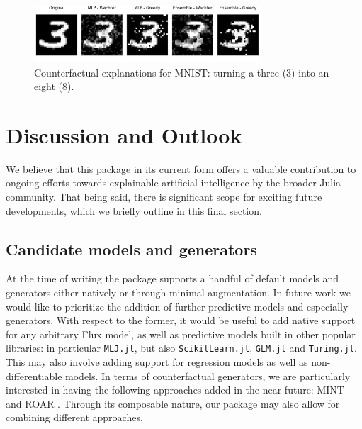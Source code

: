 \documentclass{juliacon}
\begin{document}
\begin{figure}

{\centering \includegraphics[width=3.33333in,height=0.83333in]{www/mnist_3_to_8.png}

}

\caption{\label{fig-mnist-3to8}Counterfactual explanations for MNIST:
turning a three (3) into an eight (8).}

\end{figure}

\hypertarget{sec-outlook}{%
\section{Discussion and Outlook}\label{sec-outlook}}

We believe that this package in its current form offers a valuable
contribution to ongoing efforts towards explainable artificial
intelligence by the broader Julia community. That being said, there is
significant scope for exciting future developments, which we briefly
outline in this final section.

\hypertarget{candidate-models-and-generators}{%
\subsection{Candidate models and
generators}\label{candidate-models-and-generators}}

At the time of writing the package supports a handful of default models
and generators either natively or through minimal augmentation. In
future work we would like to prioritize the addition of further
predictive models and especially generators. With respect to the former,
it would be useful to add native support for any arbitrary Flux model,
as well as predictive models built in other popular libraries: in
particular \texttt{MLJ.jl}, but also \texttt{ScikitLearn.jl},
\texttt{GLM.jl} and \texttt{Turing.jl}. This may also involve adding
support for regression models as well as non-differentiable models. In
terms of counterfactual generators, we are particularly interested in
having the following approaches added in the near future: MINT
\cite{karimi2021algorithmic} and ROAR \cite{upadhyay2021robust}. Through
its composable nature, our package may also allow for combining
different approaches.
\end{document}
